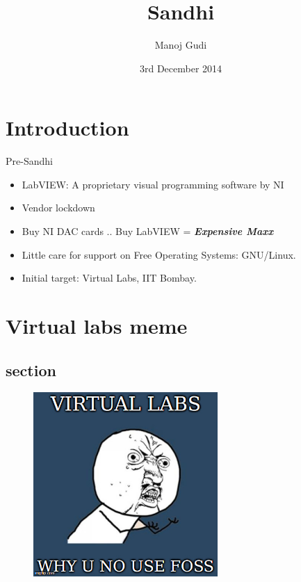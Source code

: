 \documentclass{beamer}
\title[Sandhi]{Sandhi}
\author{Manoj Gudi}
\institute{Ex-R.A. FOSSEE | CTO | FocusAnalytics}
\date{3rd December 2014}
\begin{document}
\begin{frame}
  \titlepage
\end{frame}


\section{Introduction}

\begin{frame}{Pre-Sandhi}

\begin{itemize}
  \item LabVIEW: A proprietary visual programming software by NI
  \item Vendor lockdown 
  \item Buy NI DAC cards .. Buy LabVIEW  = \textbf{ \textit{Expensive Maxx}}
  \item Little care for support on Free Operating Systems: GNU/Linux.
  \item Initial target: Virtual Labs, IIT Bombay.
\end{itemize}
\vskip 1cm
\end{frame}

\section{Virtual labs meme}
\vskip 1cm
\begin{frame}{}
\subsection{section}
\begin{figure} [ht!]
	\centering
	\includegraphics[width=70mm]{meme1.jpg}
\end{figure}
\end{frame}
\end{document}
